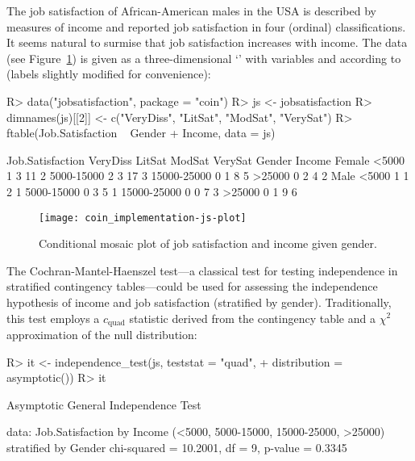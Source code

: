 \documentclass[article]{jss}
\newcommand{\Rclass}[1]{`\code{#1}'}
\begin{document}
The job satisfaction of African-American males in the USA \citep[][Table
7.8]{agresti2002} is described by measures of income and reported job
satisfaction in four (ordinal) classifications.  It seems natural to
surmise that job satisfaction increases with income.  The data (see
Figure~\ref{jsplot}) is given as a three-dimensional \Rclass{table} with
variables  and  according to
 (labels slightly modified for convenience):
\begin{Schunk}
\begin{Sinput}
R> data("jobsatisfaction", package = "coin")
R> js <- jobsatisfaction
R> dimnames(js)[[2]] <- c("VeryDiss", "LitSat", "ModSat", "VerySat")
R> ftable(Job.Satisfaction ~ Gender + Income, data = js)
\end{Sinput}
\begin{Soutput}
                   Job.Satisfaction VeryDiss LitSat ModSat VerySat
Gender Income                                                     
Female <5000                               1      3     11       2
       5000-15000                          2      3     17       3
       15000-25000                         0      1      8       5
       >25000                              0      2      4       2
Male   <5000                               1      1      2       1
       5000-15000                          0      3      5       1
       15000-25000                         0      0      7       3
       >25000                              0      1      9       6
\end{Soutput}
\end{Schunk}
\begin{figure}
\begin{center}
\texttt{[image: coin\_implementation-js-plot]}
\caption{Conditional mosaic plot of job satisfaction and income given gender.
         \label{jsplot}}
\end{center}
\end{figure}
The Cochran-Mantel-Haenszel test---a classical test for testing independence
in stratified contingency tables---could be used for
assessing the independence hypothesis of income and job satisfaction (stratified by gender).
Traditionally, this test employs a $c_\text{quad}$ statistic derived from the contingency table
and a $\chi^2$ approximation of the null distribution:
\begin{Schunk}
\begin{Sinput}
R> it <- independence_test(js, teststat = "quad",
+    distribution = asymptotic())
R> it
\end{Sinput}
\begin{Soutput}
	Asymptotic General Independence Test

data:  Job.Satisfaction by
	 Income (<5000, 5000-15000, 15000-25000, >25000) 
	 stratified by Gender 
chi-squared = 10.2001, df = 9, p-value = 0.3345
\end{Soutput}
\end{Schunk}
\end{document}
